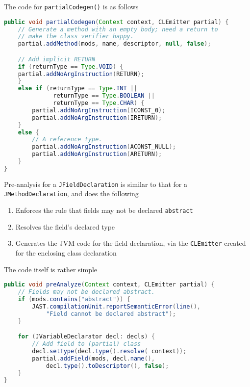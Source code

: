 \documentclass[8pt,a4paper,compress]{beamer}
\begin{document}
\begin{frame}[fragile]
\pause

The code for \lstinline{partialCodegen()} is as follows
\begin{lstlisting}[language=Java,style=focusin]
public void partialCodegen(Context context, CLEmitter partial) {
    // Generate a method with an empty body; need a return to
    // make the class verifier happy.
    partial.addMethod(mods, name, descriptor, null, false);

    // Add implicit RETURN
    if (returnType == Type.VOID) {
	partial.addNoArgInstruction(RETURN);
    }
    else if (returnType == Type.INT ||
              returnType == Type.BOOLEAN ||
              returnType == Type.CHAR) {
        partial.addNoArgInstruction(ICONST_0);
        partial.addNoArgInstruction(IRETURN);
    }
    else {
        // A reference type.
        partial.addNoArgInstruction(ACONST_NULL);
        partial.addNoArgInstruction(ARETURN);
    }
}
\end{lstlisting}
\end{frame}

\begin{frame}[fragile]
\pause

Pre-analysis for a \lstinline{JFieldDeclaration} is similar to that for a \lstinline{JMethodDeclaration}, and does the following
\begin{enumerate}
\pause
\item Enforces the rule that fields may not be declared \lstinline{abstract}
\pause
\item Resolves the field's declared type
\pause
\item Generates the JVM code for the field declaration, via the \lstinline{CLEmitter} created for the enclosing class declaration
\end{enumerate}

\pause
\bigskip

The code itself is rather simple
\begin{lstlisting}[language=Java,style=focusin]
public void preAnalyze(Context context, CLEmitter partial) {
    // Fields may not be declared abstract.
    if (mods.contains("abstract")) {
        JAST.compilationUnit.reportSemanticError(line(),
            "Field cannot be declared abstract");
    }

    for (JVariableDeclarator decl: decls) {
        // Add field to (partial) class
        decl.setType(decl.type().resolve( context));
        partial.addField(mods, decl.name(),
            decl.type().toDescriptor(), false);
    }
}
\end{lstlisting}
\end{frame}
\end{document}
